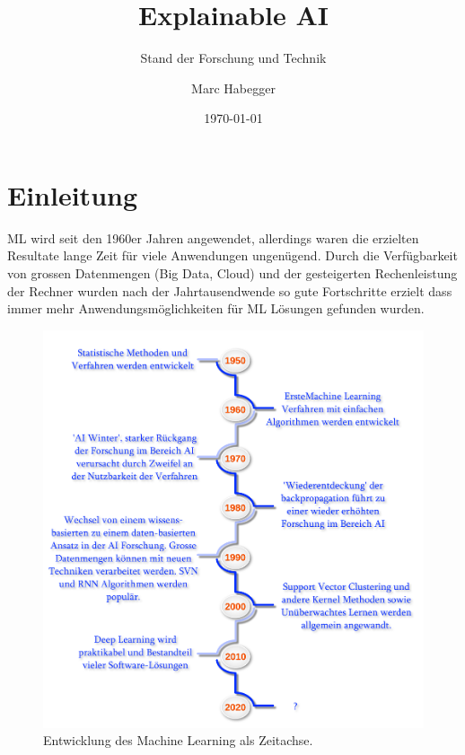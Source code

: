 \documentclass[
  12pt, %
  a4paper, %
  oneside, %
  openany, 
  numbers=noenddot, %
  BCOR=5mm, %
  parskip=half*, %
  thesis, %
]{bfhbook}
\author{Marc Habegger}
\title{Explainable AI}
\subtitle{Stand der Forschung und Technik}
\date{\today} %
\begin{document}
                         
\maketitle

\tableofcontents
\sloppy
\mainmatter %

\chapter{Einleitung}
\gls{ML} wird seit den 1960er Jahren angewendet, allerdings waren die erzielten Resultate lange Zeit für viele Anwendungen ungenügend. Durch die Verfügbarkeit von grossen Datenmengen (Big Data, Cloud) und der gesteigerten Rechenleistung der Rechner wurden nach der Jahrtausendwende so gute Fortschritte erzielt dass immer mehr Anwendungsmöglichkeiten für \gls{ML} Lösungen gefunden wurden. 

\begin{figure}[ht]
\centering
	\includegraphics[width=\textwidth]{Bilder/ML-Timeline.png}
	\caption{Entwicklung des Machine Learning als Zeitachse.}
\end{figure}
\end{document}
